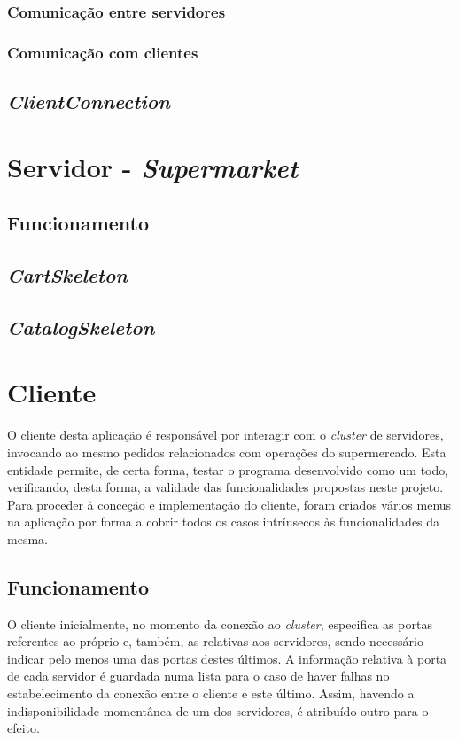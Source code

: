 \documentclass[a4paper]{report}
\begin{document}
{			\subsubsection{Comunicação entre servidores} \label{sssec:ServerCommunication}
			\subsubsection{Comunicação com clientes} \label{sssec:ClientCommunication}
		\subsection{\textit{ClientConnection}} \label{subsec:ClientConnection}
	
	\section{Servidor - \textit{Supermarket}} \label{sec:Server}
		\subsection{Funcionamento} \label{subsec:ServerWorking}
		\subsection{\textit{CartSkeleton}} \label{subsec:ServerCartSkeleton}
		\subsection{\textit{CatalogSkeleton}} \label{subsec:ServerCatalogSkeleton}
	
	\section{Cliente} \label{sec:Client}
		O cliente desta aplicação é responsável por interagir com o \textit{cluster} de servidores, invocando ao mesmo pedidos relacionados com operações do supermercado.
		Esta entidade permite, de certa forma, testar o programa desenvolvido como um todo, verificando, desta forma, a validade das funcionalidades propostas neste projeto.
		Para proceder à conceção e implementação do cliente, foram criados vários menus na aplicação por forma a cobrir todos os casos intrínsecos às funcionalidades da mesma.

		\subsection{Funcionamento} \label{subsec:ClientWorking}
		O cliente inicialmente, no momento da conexão ao \textit{cluster}, especifica as portas referentes ao próprio e, também, as relativas aos servidores, sendo necessário indicar pelo menos uma das portas destes últimos.
		A informação relativa à porta de cada servidor é guardada numa lista para o caso de haver falhas no estabelecimento da conexão entre o cliente e este último. Assim, havendo a indisponibilidade momentânea de um dos servidores, é atribuído outro para o efeito.

}
\end{document}
